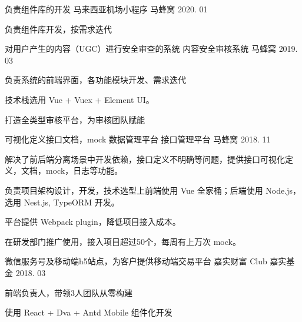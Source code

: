 

\begin{cventries}


\cventry
{负责组件库的开发} %
{马来西亚机场小程序} %
{马蜂窝} %
{2020. 01} %
{
  \begin{cvitems} %
    \item {负责组件库开发，按需求迭代}
  \end{cvitems}
}

  \cventry
    {对用户产生的内容（UGC）进行安全审查的系统} %
    {内容安全审核系统} %
    {马蜂窝} %
    {2019. 03} %
    {
      \begin{cvitems} %
        \item {负责系统的前端界面，各功能模块开发、需求迭代}
        \item {技术栈选用 Vue + Vuex + Element UI。}
        \item {打造全类型审核平台，为审核团队赋能}
      \end{cvitems}
    }

  \cventry
    {可视化定义接口文档，mock 数据管理平台} %
    {接口管理平台} %
    {马蜂窝} %
    {2018. 11} %
    {
      \begin{cvitems} %
        \item {解决了前后端分离场景中开发依赖，接口定义不明确等问题，提供接口可视化定义，文档，mock，日志等功能。}
        \item {负责项目架构设计，开发，技术选型上前端使用 Vue 全家桶；后端使用 Node.js，选用 Nest.js, TypeORM 开发。}
        \item {平台提供 Webpack plugin，降低项目接入成本。}
        \item {在研发部门推广使用，接入项目超过50个，每周有上万次 mock。}
      \end{cvitems}
    }

  \cventry
    {微信服务号及移动端h5站点，为客户提供移动端交易平台} %
    {嘉实财富 Club} %
    {嘉实基金} %
    {2018. 03} %
    {
      \begin{cvitems} %
        \item {前端负责人，带领3人团队从零构建}
        \item {使用 React + Dva + Antd Mobile 组件化开发}
      \end{cvitems}
    }

\end{cventries}

